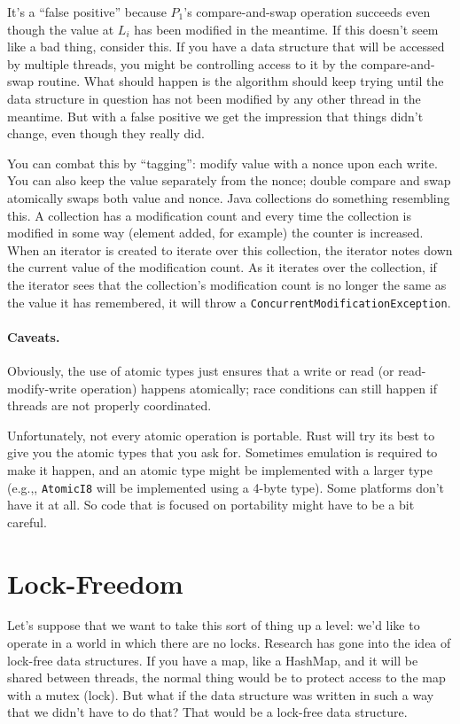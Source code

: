 \documentclass[a4paper]{report}
\begin{document}
It's a ``false positive'' because $P_{1}$'s compare-and-swap operation succeeds even though the value at $L_{i}$ has been modified in the meantime. If this doesn't seem like a bad thing, consider this. If you have a data structure that will be accessed by multiple threads, you might be controlling access to it by the compare-and-swap routine. What should happen is the algorithm should keep trying until the data structure in question has not been modified by any other thread in the meantime. But with a false positive we get the impression that things didn't change, even though they really did.

You can combat this by ``tagging'': modify value with a nonce upon each
write.  You can also keep the value separately from the nonce; double
compare and swap atomically swaps both value and nonce. Java collections do something resembling this. A collection has a modification count and every time the collection is modified in some way (element added, for example) the counter is increased. When an iterator is created to iterate over this collection, the iterator notes down the current value of the modification count. As it iterates over the collection, if the iterator sees that the collection's modification count is no longer the same as the value it has remembered, it will throw a \texttt{ConcurrentModificationException}. 


\paragraph{Caveats.}
Obviously, the use of atomic types just ensures that a write or read (or read-modify-write operation) happens atomically; race conditions can still happen if threads are not properly coordinated.


Unfortunately, not every atomic operation is portable. Rust will try its best to give you the atomic types that you ask for. Sometimes emulation is required to make it happen, and an atomic type might be implemented with a larger type (e.g.,, \texttt{AtomicI8} will be implemented using a 4-byte type). Some platforms don't have it at all. So code that is focused on portability might have to be a bit careful.

\section*{Lock-Freedom}

Let's suppose that we want to take this sort of thing up a level: we'd like to operate in a world in which there are no locks. Research has gone into the idea of lock-free data structures. If you have a map, like a HashMap, and it will be shared between threads, the normal thing would be to protect access to the map with a mutex (lock). But what if the data structure was written in such a way that we didn't have to do that? That would be a lock-free data structure.
\end{document}
